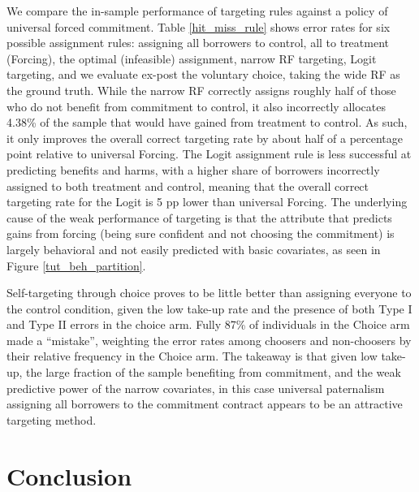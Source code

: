 \documentclass[11pt, a4paper]{article}
\begin{document}
We compare the in-sample performance of targeting rules against a policy of universal forced commitment. Table \ref{hit_miss_rule} shows error rates for six possible assignment rules: assigning all borrowers to control, all to treatment (Forcing), the optimal (infeasible) assignment, narrow RF targeting, Logit targeting, and we evaluate ex-post the voluntary choice, taking the wide RF as the ground truth. While the narrow RF correctly assigns roughly half of those who do not benefit from commitment to control, it also incorrectly allocates 4.38\% of the sample that would have gained from treatment to control. As such, it only improves the overall correct targeting rate by about half of a percentage point relative to universal Forcing. The Logit assignment rule is less successful at predicting benefits and harms, with a higher share of borrowers incorrectly assigned to both treatment and control, meaning that the overall correct targeting rate for the Logit is 5 pp lower than universal Forcing. 
The underlying cause of the weak performance of targeting is that the attribute that predicts gains from forcing (being sure confident and not choosing the commitment) is largely behavioral and not easily predicted with basic covariates, as seen in Figure \ref{tut_beh_partition}. 

Self-targeting through choice proves to be little better than assigning everyone to the control condition, given the low take-up rate and the presence of both Type I and Type II errors in the choice arm. Fully 87\% of individuals in the Choice arm made a ``mistake'', weighting the error rates among choosers and non-choosers by their relative frequency in the Choice arm. The takeaway is that given low take-up, the large fraction of the sample benefiting from commitment, and the weak predictive power of the narrow covariates, in this case universal paternalism assigning all borrowers to the commitment contract appears to be an attractive targeting method.

    
\section{Conclusion} \label{conclusion}
\end{document}
